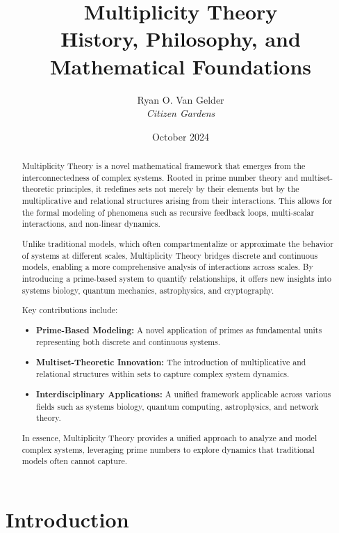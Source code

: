 \documentclass[12pt]{article}
\title{Multiplicity Theory \\ History, Philosophy, and Mathematical Foundations}
\author{Ryan O. Van Gelder \\ \textit{Citizen Gardens}}
\date{October 2024}
\begin{document}
\maketitle

\begin{abstract}
Multiplicity Theory is a novel mathematical framework that emerges from the interconnectedness of complex systems. Rooted in prime number theory and multiset-theoretic principles, it redefines sets not merely by their elements but by the multiplicative and relational structures arising from their interactions. This allows for the formal modeling of phenomena such as recursive feedback loops, multi-scalar interactions, and non-linear dynamics.

Unlike traditional models, which often compartmentalize or approximate the behavior of systems at different scales, Multiplicity Theory bridges discrete and continuous models, enabling a more comprehensive analysis of interactions across scales. By introducing a prime-based system to quantify relationships, it offers new insights into systems biology, quantum mechanics, astrophysics, and cryptography.

Key contributions include:
\begin{itemize}
    \item \textbf{Prime-Based Modeling:} A novel application of primes as fundamental units representing both discrete and continuous systems.
    \item \textbf{Multiset-Theoretic Innovation:} The introduction of multiplicative and relational structures within sets to capture complex system dynamics.
    \item \textbf{Interdisciplinary Applications:} A unified framework applicable across various fields such as systems biology, quantum computing, astrophysics, and network theory.
\end{itemize}
In essence, Multiplicity Theory provides a unified approach to analyze and model complex systems, leveraging prime numbers to explore dynamics that traditional models often cannot capture.
\end{abstract}

\maketitle
\tableofcontents


\section{Introduction}
\end{document}
